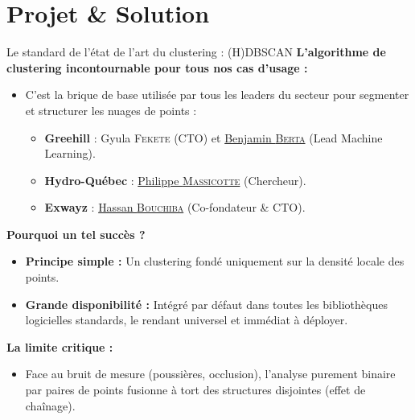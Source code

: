 \documentclass[A4,svgnames,9pt,aspectratio=169]{beamer}
\begin{document}
\section{Projet \& Solution}
\begin{frame}{Le standard de l'état de l'art du clustering : (H)DBSCAN}
    \textbf{\bleu L'algorithme de clustering incontournable pour tous nos cas d'usage :}
    \begin{itemize}
        \item C'est la brique de base utilisée par tous les leaders du secteur pour segmenter et structurer les nuages de points :
        \begin{itemize}
            \item \textbf{Greehill} : Gyula \textsc{Fekete} (CTO) et \href{https://www.linkedin.com/in/benjamin-berta/?locale=hu}{Benjamin \textsc{Berta}} (Lead Machine Learning).
            \item \textbf{Hydro-Québec} : \href{https://www.linkedin.com/in/philippemassicotte/}{Philippe \textsc{Massicotte}} (Chercheur).
            \item \textbf{Exwayz} : \href{https://www.linkedin.com/in/hassan-bouchiba-434078202/}{Hassan \textsc{Bouchiba}} (Co-fondateur \& CTO).
        \end{itemize}
    \end{itemize}
    
    \vspace{0.3cm}
    
    \textbf{\bleu Pourquoi un tel succès ?}
    \begin{itemize}
        \item \textbf{Principe simple :} Un clustering fondé uniquement sur la densité locale des points.
        \item \textbf{Grande disponibilité :} Intégré par défaut dans toutes les bibliothèques logicielles standards, le rendant universel et immédiat à déployer.
    \end{itemize}
    
    \vspace{0.3cm}
    
    \textbf{\bleu La limite critique :}
    \begin{itemize}
        \item Face au bruit de mesure (poussières, occlusion), l'analyse purement binaire par paires de points fusionne à tort des structures disjointes (effet de chaînage).
    \end{itemize}
\end{frame}
\end{document}
